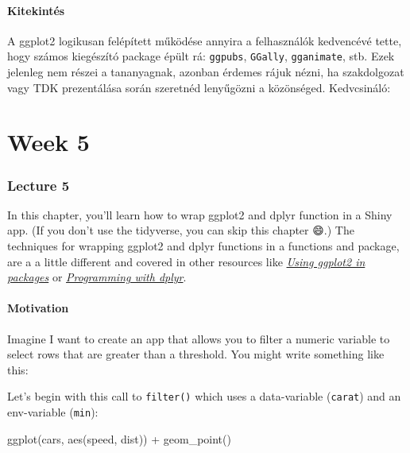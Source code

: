 \documentclass[
]{article}
\newenvironment{Shaded}{\begin{snugshade}}{\end{snugshade}}
\newcommand{\FunctionTok}[1]{\textcolor[rgb]{0.00,0.00,0.00}{#1}}
\newcommand{\NormalTok}[1]{#1}
\newcommand{\SpecialCharTok}[1]{\textcolor[rgb]{0.00,0.00,0.00}{#1}}
\begin{document}
\hypertarget{kitekintuxe9s}{%
\subsection{Kitekintés}\label{kitekintuxe9s}}

A ggplot2 logikusan felépített működése annyira a felhasználók kedvencévé tette, hogy számos kiegészító package épült rá: \texttt{ggpubs}, \texttt{GGally}, \texttt{gganimate}, stb. Ezek jelenleg nem részei a tananyagnak, azonban érdemes rájuk nézni, ha szakdolgozat vagy TDK prezentálása során szeretnéd lenyűgözni a közönséged. Kedvcsináló:

\hypertarget{part-week-5}{%
\part*{Week 5}\label{part-week-5}}

\hypertarget{lecture5}{%
\section{Lecture 5}\label{lecture5}}

In this chapter, you'll learn how to wrap ggplot2 and dplyr function in a Shiny app.
(If you don't use the tidyverse, you can skip this chapter 😄.) The techniques for wrapping ggplot2 and dplyr functions in a functions and package, are a a little different and covered in other resources like \href{http://ggplot2.tidyverse.org/dev/articles/ggplot2-in-packages.html}{\emph{Using ggplot2 in packages}} or \href{http://dplyr.tidyverse.org/articles/programming.html}{\emph{Programming with dplyr}}.

\hypertarget{tidy-motivation}{%
\subsection{Motivation}\label{tidy-motivation}}

Imagine I want to create an app that allows you to filter a numeric variable to select rows that are greater than a threshold.
You might write something like this:

Let's begin with this call to \texttt{filter()} which uses a data-variable (\texttt{carat}) and an env-variable (\texttt{min}):

\begin{Shaded}
\begin{Highlighting}[]
\FunctionTok{ggplot}\NormalTok{(cars, }\FunctionTok{aes}\NormalTok{(speed, dist)) }\SpecialCharTok{+} 
  \FunctionTok{geom\_point}\NormalTok{()}
\end{Highlighting}
\end{Shaded}
\end{document}
